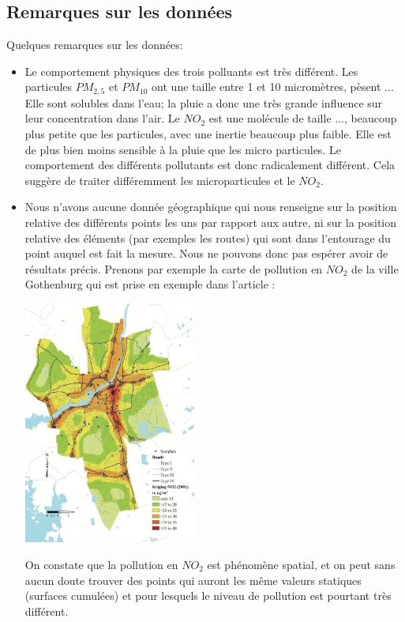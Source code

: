 \subsection{Remarques sur les données}
Quelques remarques sur les données:
\begin{itemize}
  \item
    Le comportement physiques des trois polluants est très différent.
    Les particules $PM_{2,5}$ et $PM_{10}$ ont une taille entre 1 et 10 micromètres, pèsent ...
    Elle sont solubles dans l'eau; la pluie a donc une très grande influence sur leur concentration dans l'air.
    Le $NO_2$ est une molécule de taille ..., beaucoup plus petite que les particules, avec une inertie beaucoup plus faible.
    Elle est de plus bien moins sensible à la pluie que les micro particules.
    Le comportement des différents pollutants est donc radicalement différent.
    Cela suggère de traiter différemment les microparticules et le $NO_2$.
  \item
    Nous n'avons aucune donnée géographique qui nous renseigne sur la position relative des différents points les uns par rapport aux autre, ni sur la position relative des éléments (par exemples les routes) qui sont dans l'entourage du point auquel est fait la mesure.
    Nous ne pouvons donc pas espérer avoir de résultats précis.
    Prenons par exemple la carte de pollution en $NO_2$ de la ville Gothenburg qui est prise en exemple dans l'article \cite{}:
    \begin{center}
    \includegraphics[height=8cm]{images/pollution_gothenburg.png}
    \end{center}
    On constate que la pollution en $NO_2$ est phénomène spatial, et on peut sans aucun doute trouver des points qui auront les même valeurs statiques (surfaces cumulées) et pour lesquels le niveau de pollution est pourtant très différent.

\end{itemize}
